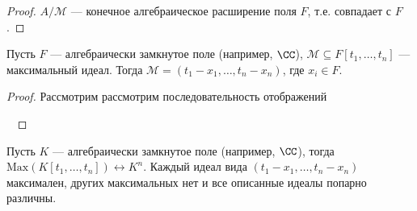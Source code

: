 \documentclass[12pt,a4paper]{article}
\newcommand{\Max}{\mathrm{Max}}
\begin{document}
    \begin{proof}
        $A/\mathcal{M}$ --- конечное алгебраическое расширение поля $F$, т.е. совпадает с $F$.
    \end{proof}

    \begin{theorem}
        Пусть $F$ --- алгебраически замкнутое поле (например, $\CC$), $\mathcal{M} \subseteq F[t_1, \dots, t_n]$ --- максимальный идеал. Тогда $\mathcal{M} = (t_1-x_1, \dots, t_n-x_n)$, где $x_i \in F$.
    \end{theorem}

    \begin{proof}
        Рассмотрим рассмотрим последовательность отображений

        \
    \end{proof}

    \begin{theorem}
        Пусть $K$ --- алгебраически замкнутое поле (например, $\CC$), тогда $\Max(K[t_1, \dots, t_n]) \leftrightarrow K^n$. Каждый идеал вида $(t_1 - x_1, \dots, t_n - x_n)$ максимален, других максимальных нет и все описанные идеалы попарно различны.
    \end{theorem}
\end{document}
